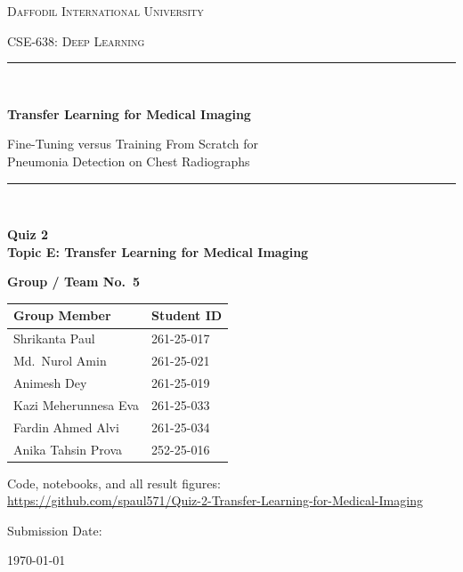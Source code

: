 \documentclass[11pt,a4paper]{article}
\numberwithin{figure}{section}
\numberwithin{table}{section}
\begin{document}
\begin{titlepage}
\centering
\vspace*{1.5cm}

{\scshape\large Daffodil International University\par}
\vspace{0.4cm}
{\scshape CSE-638: Deep Learning\par}
\vspace{2.0cm}

\rule{\linewidth}{0.4mm}\\[0.5cm]
{\huge\bfseries Transfer Learning for Medical Imaging\par}
\vspace{0.6cm}
{\Large Fine-Tuning versus Training From Scratch for\\[0.2cm]
Pneumonia Detection on Chest Radiographs\par}
\rule{\linewidth}{0.4mm}\\[1.5cm]

{\large\textbf{Quiz 2\\Topic E: Transfer Learning for Medical Imaging}\par}
\vspace{1.5cm}

{\large\textbf{Group / Team No.\ 5}\par}

{\large
\begin{tabular}{ll}
\toprule
\textbf{Group Member} & \textbf{Student ID} \\
\midrule
Shrikanta Paul & 261-25-017 \\
Md.\ Nurol Amin & 261-25-021 \\
Animesh Dey & 261-25-019 \\
Kazi Meherunnesa Eva & 261-25-033 \\
Fardin Ahmed Alvi & 261-25-034 \\
Anika Tahsin Prova & 252-25-016 \\
\bottomrule
\end{tabular}\par}

\vfill


\vspace{1.6cm}

{\small Code, notebooks, and all result figures:\\
\url{https://github.com/spaul571/Quiz-2-Transfer-Learning-for-Medical-Imaging}\par}

\vspace{1.0cm}
Submission Date: {\large \today\par}
\end{titlepage}
\end{document}
